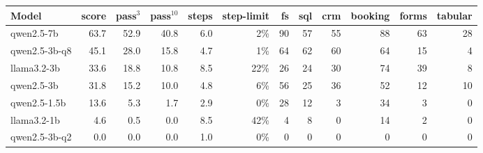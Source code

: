 \begin{tabular}{lrrrrrrrrrrr}
\toprule
Model & score & pass$^3$ & pass$^{10}$ & steps & step-limit & fs & sql & crm & booking & forms & tabular \\
\midrule
qwen2.5-7b & 63.7 & 52.9 & 40.8 & 6.0 & 2\% & 90 & 57 & 55 & 88 & 63 & 28 \\
qwen2.5-3b-q8 & 45.1 & 28.0 & 15.8 & 4.7 & 1\% & 64 & 62 & 60 & 64 & 15 & 4 \\
llama3.2-3b & 33.6 & 18.8 & 10.8 & 8.5 & 22\% & 26 & 24 & 30 & 74 & 39 & 8 \\
qwen2.5-3b & 31.8 & 15.2 & 10.0 & 4.8 & 6\% & 56 & 25 & 36 & 52 & 12 & 10 \\
qwen2.5-1.5b & 13.6 & 5.3 & 1.7 & 2.9 & 0\% & 28 & 12 & 3 & 34 & 3 & 0 \\
llama3.2-1b & 4.6 & 0.5 & 0.0 & 8.5 & 42\% & 4 & 8 & 0 & 14 & 2 & 0 \\
qwen2.5-3b-q2 & 0.0 & 0.0 & 0.0 & 1.0 & 0\% & 0 & 0 & 0 & 0 & 0 & 0 \\
\bottomrule
\end{tabular}

